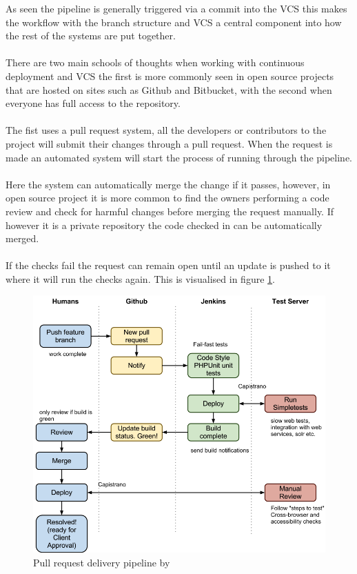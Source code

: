 As seen the pipeline is generally triggered via a commit into the VCS this makes the workflow with the branch structure and VCS a central component into how the rest of the systems are put together.
\\\\
There are two main schools of thoughts when working with continuous deployment and VCS the first is more commonly seen in open source projects that are hosted on sites such as Github and Bitbucket, with the second when everyone has full access to the repository. 
\\\\
The fist uses a pull request system, all the developers or contributors to the project will submit their changes through a pull request. When the request is made an automated system will start the process of running through the pipeline. 
\\\\
Here the system can automatically merge the change if it passes, however, in open source project it is more common to find the owners performing a code review and check for harmful changes before merging the request manually. If however it is a private repository the code checked in can be automatically merged. 
\\\\
If the checks fail the request can remain open until an update is pushed to it where it will run the checks again. This is visualised in figure \ref{fig:osspipeline}.

\begin{figure}[H]
	\centering
	\includegraphics[scale=0.4]{images/osspipeline.png}
	\caption{Pull request delivery pipeline by \cite{osspipeline}}
	\label{fig:osspipeline}
\end{figure}

